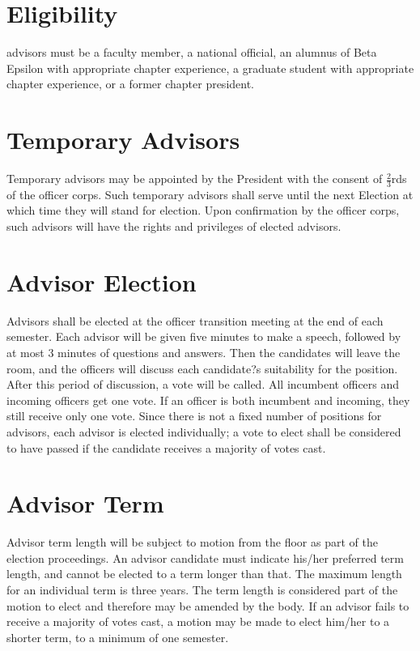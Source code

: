 \section{Eligibility}
advisors must be a faculty member, a national official, an alumnus of Beta Epsilon with appropriate chapter experience, a graduate student with appropriate chapter experience, or a former chapter president. 

\section{Temporary Advisors}
Temporary advisors may be appointed by the President with the consent of $\frac{2}{3}$rds of the officer corps. Such temporary advisors shall serve until the next Election at which time they will stand for election. Upon confirmation by the officer corps, such advisors will have the rights and privileges of elected advisors. 

\section{Advisor Election}

Advisors shall be elected at the officer transition meeting at the end of each semester.  Each advisor will be given five minutes to make a speech, followed by at most 3 minutes of questions and answers.  Then the candidates will leave the room, and the officers will discuss each candidate?s suitability for the position.  After this period of discussion, a vote will be called.  All incumbent officers and incoming officers get one vote.  If an officer is both incumbent and incoming, they still receive only one vote.  Since there is not a fixed number of positions for advisors, each advisor is elected individually; a vote to elect shall be considered to have passed if the candidate receives a majority of votes cast. 

\section{Advisor Term}
Advisor term length will be subject to motion from the floor as part of the election proceedings. An advisor candidate must indicate his/her preferred term length, and cannot be elected to a term longer than that. The maximum length for an individual term is three years. The term length is considered part of the motion to elect and therefore may be amended by the body. If an advisor fails to receive a majority of votes cast, a motion may be made to elect him/her to a shorter term, to a minimum of one semester.

